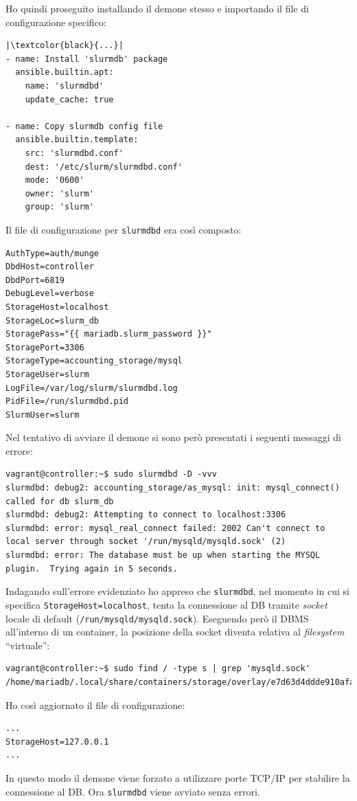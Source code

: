 \documentclass[12pt,a4paper,twoside,openright]{book}
\begin{document}
Ho quindi proseguito installando il demone stesso e importando il file di configurazione specifico:
\begin{verbatim}
|\textcolor{black}{...}|
- name: Install 'slurmdb' package
  ansible.builtin.apt:
    name: 'slurmdbd'
    update_cache: true

- name: Copy slurmdb config file 
  ansible.builtin.template:
    src: 'slurmdbd.conf'
    dest: '/etc/slurm/slurmdbd.conf'
    mode: '0600'
    owner: 'slurm'
    group: 'slurm'
\end{verbatim}
Il file di configurazione per \texttt{slurmdbd} era così composto:
\begin{verbatim}
AuthType=auth/munge
DbdHost=controller
DbdPort=6819
DebugLevel=verbose
StorageHost=localhost
StorageLoc=slurm_db
StoragePass="{{ mariadb.slurm_password }}"
StoragePort=3306
StorageType=accounting_storage/mysql
StorageUser=slurm
LogFile=/var/log/slurm/slurmdbd.log
PidFile=/run/slurmdbd.pid
SlurmUser=slurm
\end{verbatim}
Nel tentativo di avviare il demone si sono però presentati i seguenti messaggi di errore:
\begin{verbatim}
vagrant@controller:~$ sudo slurmdbd -D -vvv
slurmdbd: debug2: accounting_storage/as_mysql: init: mysql_connect() called for db slurm_db
slurmdbd: debug2: Attempting to connect to localhost:3306
slurmdbd: error: mysql_real_connect failed: 2002 Can't connect to local server through socket '/run/mysqld/mysqld.sock' (2)
slurmdbd: error: The database must be up when starting the MYSQL plugin.  Trying again in 5 seconds.
\end{verbatim}
Indagando sull'errore evidenziato ho appreso che \texttt{slurmdbd}, nel momento in cui si specifica \texttt{StorageHost=localhost}, tenta la connessione al \ac{DB} tramite \textit{socket} locale di default (\texttt{/run/mysqld/mysqld.sock}). Eseguendo però il \ac{DBMS} all'interno di un container, la posizione della socket diventa relativa al \textit{filesystem} ``virtuale'':
\begin{verbatim}
vagrant@controller:~$ sudo find / -type s | grep 'mysqld.sock'
/home/mariadb/.local/share/containers/storage/overlay/e7d63d4ddde910afaf1d2574c3345fc74c42372bffc95f84528ead29c2f52d7e/diff/run/mysqld/mysqld.sock
\end{verbatim}
Ho così aggiornato il file di configurazione:
\begin{verbatim}
...
StorageHost=127.0.0.1
...
\end{verbatim}
In questo modo il demone viene forzato a utilizzare porte \ac{TCP}/\ac{IP} per stabilire la connessione al \ac{DB}. Ora \texttt{slurmdbd} viene avviato senza errori.
\end{document}
